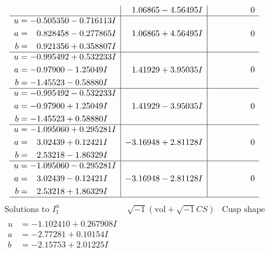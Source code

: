 \documentclass[1p]{elsarticle_modified}
\theoremstyle{definition}
\newcommand{\I}{\sqrt{-1}}
\begin{document}
$$\begin{array}{c|c|c}
 & \phantom{-}1.06865 - 4.56495 I & \phantom{-0.000000 } 0 \\ \hline\begin{aligned}
u &= -0.505350 - 0.716113 I \\
a &= \phantom{-}0.828458 - 0.277865 I \\
b &= \phantom{-}0.921356 + 0.358807 I\end{aligned}
 & \phantom{-}1.06865 + 4.56495 I & \phantom{-0.000000 } 0 \\ \hline\begin{aligned}
u &= -0.995492 + 0.532233 I \\
a &= -0.97900 - 1.25049 I \\
b &= -1.45523 - 0.58880 I\end{aligned}
 & \phantom{-}1.41929 + 3.95035 I & \phantom{-0.000000 } 0 \\ \hline\begin{aligned}
u &= -0.995492 - 0.532233 I \\
a &= -0.97900 + 1.25049 I \\
b &= -1.45523 + 0.58880 I\end{aligned}
 & \phantom{-}1.41929 - 3.95035 I & \phantom{-0.000000 } 0 \\ \hline\begin{aligned}
u &= -1.095060 + 0.295281 I \\
a &= \phantom{-}3.02439 + 0.12421 I \\
b &= \phantom{-}2.53218 - 1.86329 I\end{aligned}
 & -3.16948 + 2.81128 I & \phantom{-0.000000 } 0 \\ \hline\begin{aligned}
u &= -1.095060 - 0.295281 I \\
a &= \phantom{-}3.02439 - 0.12421 I \\
b &= \phantom{-}2.53218 + 1.86329 I\end{aligned}
 & -3.16948 - 2.81128 I & \phantom{-0.000000 } 0\\
 \hline 
 \end{array}$$\newpage$$\begin{array}{c|c|c}  
\text{Solutions to }I^u_{1}& \I (\text{vol} + \sqrt{-1}CS) & \text{Cusp shape}\\
 \hline 
\begin{aligned}
u &= -1.102410 + 0.267908 I \\
a &= -2.77281 + 0.10154 I \\
b &= -2.15753 + 2.01225 I\end{aligned}

\end{array}$$
\end{document}
